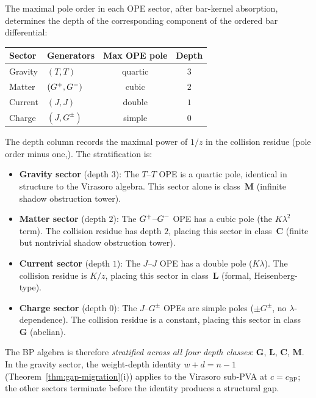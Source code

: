 \begin{computation}[The ordered bar complex of the
Bershadsky--Polyakov algebra
$\mathcal{B}^{k'} = W_{k'}(\mathfrak{sl}_3,f_{\min})$;
\ClaimStatusProvedHere]
\begin{remark}
\label{rem:bp-depth-stratification}
The maximal pole order in each OPE sector, after bar-kernel
absorption, determines the depth of the corresponding
component of the ordered bar differential:
\begin{center}
\renewcommand{\arraystretch}{1.15}
\begin{tabular}{llcc}
\textbf{Sector} & \textbf{Generators}
& \textbf{Max OPE pole} & \textbf{Depth} \\
\hline
Gravity & $(T,T)$ & quartic & $3$ \\
Matter & $(G^+,G^-)$ & cubic & $2$ \\
Current & $(J,J)$ & double & $1$ \\
Charge & $(J,G^\pm)$ & simple & $0$
\end{tabular}
\end{center}
The depth column records the maximal power of $1/z$ in the
collision residue (pole order minus one,). The
stratification is:
\begin{itemize}
\item \textbf{Gravity sector} (depth $3$): The $T$--$T$ OPE
is a quartic pole, identical in structure to the Virasoro
algebra. This sector alone is class~$\mathbf{M}$
(infinite shadow obstruction tower).
\item \textbf{Matter sector} (depth $2$): The $G^+$--$G^-$
OPE has a cubic pole (the $K\lambda^2$ term). The collision
residue has depth $2$, placing this sector in
class~$\mathbf{C}$ (finite but nontrivial shadow obstruction tower).
\item \textbf{Current sector} (depth $1$): The $J$--$J$ OPE
has a double pole ($K\lambda$). The collision residue is
$K/z$, placing this sector in class~$\mathbf{L}$
(formal, Heisenberg-type).
\item \textbf{Charge sector} (depth $0$): The $J$--$G^\pm$
OPEs are simple poles ($\pm G^\pm$, no $\lambda$-dependence).
The collision residue is a constant, placing this sector in
class~$\mathbf{G}$ (abelian).
\end{itemize}
The BP algebra is therefore \emph{stratified across all four
depth classes}: $\mathbf{G}$, $\mathbf{L}$, $\mathbf{C}$,
$\mathbf{M}$. In the gravity sector, the weight-depth identity $w + d = n - 1$ (Theorem~\ref{thm:gap-migration}(i)) applies to the Virasoro sub-PVA at $c = c_{\mathrm{BP}}$; the other sectors terminate before the identity produces a structural gap.

\end{remark}
\end{computation}

